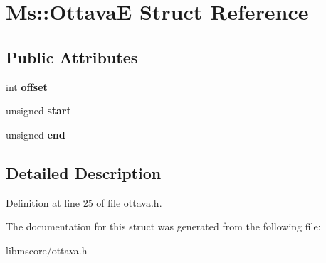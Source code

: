 \hypertarget{struct_ms_1_1_ottava_e}{}\section{Ms\+:\+:OttavaE Struct Reference}
\label{struct_ms_1_1_ottava_e}
\subsection*{Public Attributes}
\begin{DoxyCompactItemize}
\item 
\mbox{\label{struct_ms_1_1_ottava_e_afdd765033a8496459f651cc89eefb4ac}} 
int {\bfseries offset}
\item 
\mbox{\label{struct_ms_1_1_ottava_e_a29d9705e2b7b95dd24309fd20dc252ac}} 
unsigned {\bfseries start}
\item 
\mbox{\label{struct_ms_1_1_ottava_e_aba76c026f08914f03f3bc299bb37da41}} 
unsigned {\bfseries end}
\end{DoxyCompactItemize}


\subsection{Detailed Description}


Definition at line 25 of file ottava.\+h.



The documentation for this struct was generated from the following file\+:\begin{DoxyCompactItemize}
\item 
libmscore/ottava.\+h\end{DoxyCompactItemize}
